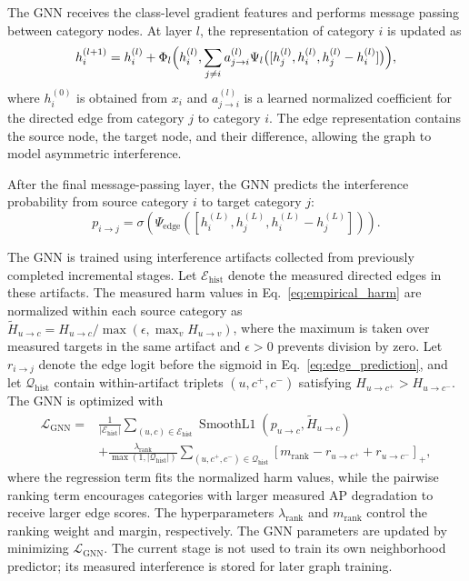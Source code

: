 The GNN receives the class-level gradient features and performs message passing
between category nodes. At layer $l$, the representation of category $i$ is
updated as
\begin{equation}
\begin{aligned}
h_i^{(l+1)}=h_i^{(l)}+\Phi_l\Bigl(
h_i^{(l)},\sum_{j\neq i}a_{j\rightarrow i}^{(l)}
\Psi_l\bigl([h_j^{(l)},h_i^{(l)},h_j^{(l)}-h_i^{(l)}]\bigr)
\Bigr),
\end{aligned}
\label{eq:gnn_message_passing}
\end{equation}
where $h_i^{(0)}$ is obtained from $x_i$ and $a_{j\rightarrow i}^{(l)}$
is a learned normalized coefficient for the directed edge from category $j$
to category $i$. The edge representation contains the source node, the target
node, and their difference, allowing the graph to model asymmetric interference.

After the final message-passing layer, the GNN predicts the interference
probability from source category $i$ to target category $j$:
\begin{equation}
p_{i\rightarrow j}
=\sigma\left(\Psi_{\mathrm{edge}}\left(
[h_i^{(L)},h_j^{(L)},h_i^{(L)}-h_j^{(L)}]
\right)\right).
\label{eq:edge_prediction}
\end{equation}

The GNN is trained using interference artifacts collected from previously
completed incremental stages. Let $\mathcal{E}_{\mathrm{hist}}$ denote the
measured directed edges in these artifacts. The measured harm values in
Eq.~\ref{eq:empirical_harm} are normalized within each source category as
$\widetilde{H}_{u\rightarrow c}
=H_{u\rightarrow c}/\max(\epsilon,\max_v H_{u\rightarrow v})$,
where the maximum is taken over measured targets in the same artifact and
$\epsilon>0$ prevents division by zero. Let $r_{i\rightarrow j}$ denote
the edge logit before the sigmoid in Eq.~\ref{eq:edge_prediction}, and let
$\mathcal{Q}_{\mathrm{hist}}$ contain within-artifact triplets
$(u,c^+,c^-)$ satisfying $H_{u\rightarrow c^+}>H_{u\rightarrow c^-}$.
The GNN is optimized with
\begin{equation}
\begin{aligned}
\mathcal{L}_{\mathrm{GNN}}
={}&\frac{1}{|\mathcal{E}_{\mathrm{hist}}|}
\sum_{(u,c)\in\mathcal{E}_{\mathrm{hist}}}
\operatorname{SmoothL1}\left(p_{u\rightarrow c},
\widetilde{H}_{u\rightarrow c}\right)\\
&+\frac{\lambda_{\mathrm{rank}}}{\max(1,|\mathcal{Q}_{\mathrm{hist}}|)}
\sum_{(u,c^+,c^-)\in\mathcal{Q}_{\mathrm{hist}}}
\left[m_{\mathrm{rank}}-r_{u\rightarrow c^+}
+r_{u\rightarrow c^-}\right]_{+},
\end{aligned}
\label{eq:gnn_loss}
\end{equation}
where the regression term fits the normalized harm values, while the pairwise
ranking term encourages categories with larger measured AP degradation to
receive larger edge scores. The hyperparameters $\lambda_{\mathrm{rank}}$
and $m_{\mathrm{rank}}$ control the ranking weight and margin, respectively.
The GNN parameters are updated by minimizing $\mathcal{L}_{\mathrm{GNN}}$.
The current stage is not used to train its own neighborhood predictor; its
measured interference is stored for later graph training.

